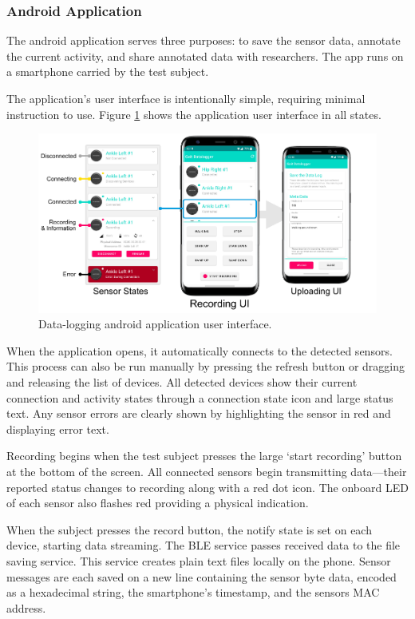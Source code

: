 \subsubsection{Android Application}
The android application serves three purposes: to save the sensor data, annotate the current activity, and share annotated data with researchers. The app runs on a smartphone carried by the test subject.

The application's user interface is intentionally simple, requiring minimal instruction to use. Figure \ref{fig:methods-app-user-interface} shows the application user interface in all states.

\begin{figure}[hbt]
    \centering
    \includegraphics[width=\textwidth]{content/3-Methods/User_Interface.pdf}
    \caption{Data-logging android application user interface.}
    \label{fig:methods-app-user-interface}
\end{figure}

When the application opens, it automatically connects to the detected sensors. This process can also be run manually by pressing the refresh button or dragging and releasing the list of devices. All detected devices show their current connection and activity states through a connection state icon and large status text. Any sensor errors are clearly shown by highlighting the sensor in red and displaying error text.

Recording begins when the test subject presses the large `start recording' button at the bottom of the screen. All connected sensors begin transmitting data—their reported status changes to recording along with a red dot icon. The onboard LED of each sensor also flashes red providing a physical indication.

When the subject presses the record button, the notify state is set on each device, starting data streaming. The BLE service passes received data to the file saving service. This service creates plain text files locally on the phone. Sensor messages are each saved on a new line containing the sensor byte data, encoded as a hexadecimal string, the smartphone's timestamp, and the sensors MAC address.

